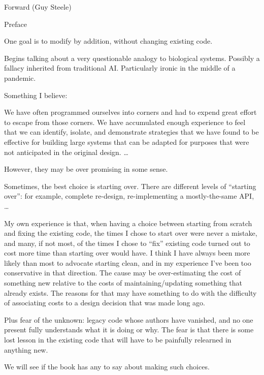 \documentclass[11pt]{PalisadesLakesBook}
\begin{document}
\begin{plSection}{}
\begin{plSection}{Forward (Guy Steele)}
\end{plSection}%
\begin{plSection}{Preface}

One goal is to modify by addition, 
without changing existing code.

Begins talking about a very questionable analogy 
to biological systems.
Possibly a fallacy inherited from traditional AI.
Particularly ironic in the middle of a pandemic.

Something I believe:
\begin{plQuote}
{}{}
We have often programmed ourselves into corners
and had to expend great effort to escape from those corners.
We have accumulated enough experience to feel that we can
identify, isolate, and demonstrate strategies
that we have found to be effective for building large systems
that can be adapted for purposes 
that were not anticipated in the original design. {\ldots}
\end{plQuote}
However, they may be over promising in some sense.

Sometimes, the best choice is starting over.
There are different levels of ``starting over'':
for example, complete re-design, 
re-implementing a mostly-the-same API, {\ldots}

My own experience is that, when having a choice
between starting from scratch and fixing the existing code,
the times I chose to start over were never a mistake,
and many, if not most, of the times I chose to ``fix'' existing
code turned out to cost more time than starting over would have.
I think I have always been more likely than most 
                to advocate starting clean,
and in my experience I've been too conservative in that direction.
The cause may be over-estimating the cost of something new
relative to the costs of maintaining/updating something that
already exists. The reasons for that may have something to do
with the difficulty of associating costs to a design decision
that was made long ago.

Plus fear of the unknown: legacy code whose authors have vanished,
and no one present fully understands what it is doing or why.
The fear is that there is some lost lesson in the existing
code that will have to be painfully relearned in anything new.

We will see if the book has any to say about making such choices.


\end{plSection}
\end{plSection}
\end{document}
